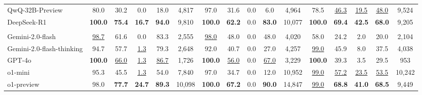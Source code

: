 \begin{table*}[!t]
{\begin{tabular}{l|ccccc|ccccc|ccccc}
        QwQ-32B-Preview & 80.0 & 30.2 & 0.0 & 18.0 & 4,817 & 97.0 & 31.6 & 0.0 & 6.0 & 4,964 & 78.5 & \underline{46.3} & \underline{19.5} & \underline{48.0} & 9,524 \\
        DeepSeek-R1 & \textbf{100.0} & \textbf{75.4} & \textbf{16.7} & \textbf{94.0} & 9,810 & \textbf{100.0} & \textbf{62.2} & 0.0 & \textbf{83.0} & 10,077 & \textbf{100.0} & \textbf{69.4} & \textbf{42.5} & \textbf{68.0} & 9,205\\
        \midrule
        \rowcolor{blue!15} \multicolumn{16}{l}{\textit{\textbf{Closed-source LLMs}}}\\
        \midrule
        Gemini-2.0-flash & \underline{98.7} & 61.6 & 0.0 & 83.3 & 2,555 & \underline{98.0} & 48.0 & 0.0 & 48.0 & 4,020 & 58.0 & 24.2 & 2.0 & 20.0 & 2,104 \\
        Gemini-2.0-flash-thinking & 94.7 & 57.7 & \underline{1.3} & 79.3 & 2,648 & 92.0 & 40.7 & 0.0 & 27.0 & 4,257 & \underline{99.0} & 45.9 & 8.0 & 37.5 & 4,038 \\
        GPT-4o & \textbf{100.0} & \underline{66.0} & \underline{1.3} & \underline{86.7} & 1,726 & \textbf{100.0} & \underline{56.0} & 0.0 & \underline{67.0} & 3,229 & \textbf{100.0} & 39.3 & 3.5 & 29.5 & 953 \\
        o1-mini & 95.3 & 45.5 & \underline{1.3} & 54.0 & 7,840 & 97.0 & 34.7 & 0.0 & 12.0 & 10,952 & \underline{99.0} & \underline{57.2} & \underline{23.5} & \underline{53.5} & 10,242 \\
        o1-preview & 98.0 & \textbf{77.7} & \textbf{24.7} & \textbf{89.3} & 10,098 & \textbf{100.0} & \textbf{67.2} & 0.0 & \textbf{90.0} & 14,847 & \underline{99.0} & \textbf{68.8} & \textbf{41.0} & \textbf{68.5} & 9,449 \\ 
        \bottomrule
    \end{tabular}}
\end{table*}
